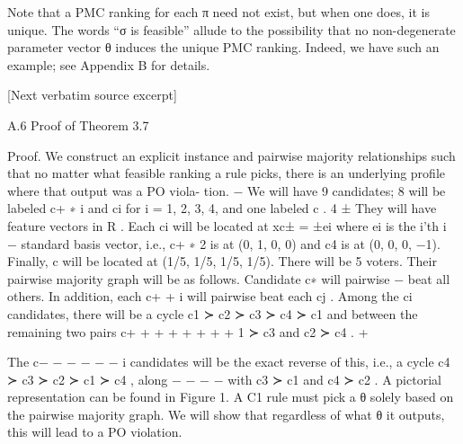 \documentclass[10pt]{article}
\begin{document}
\begin{ReviewVerbatim}
Note that a PMC ranking for each π need not exist, but when one does, it is unique. The words “σ
is feasible” allude to the possibility that no non-degenerate parameter vector θ induces the unique
PMC ranking. Indeed, we have such an example; see Appendix B for details.

[Next verbatim source excerpt]

A.6   Proof of Theorem 3.7

Proof. We construct an explicit instance and pairwise majority relationships such that no matter
what feasible ranking a rule picks, there is an underlying profile where that output was a PO viola-
tion.
                                                       −
We will have 9 candidates; 8 will be labeled c+                                              ∗
                                              i and ci for i = 1, 2, 3, 4, and one labeled c .
                                   4        ±
They will have feature vectors in R . Each ci will be located at xc± = ±ei where ei is the i’th
                                                                           i
                                                        −
standard basis vector, i.e., c+                                                          ∗
                              2 is at (0, 1, 0, 0) and c4 is at (0, 0, 0, −1). Finally, c will be located at
(1/5, 1/5, 1/5, 1/5).
There will be 5 voters. Their pairwise majority graph will be as follows. Candidate c∗ will pairwise
                                                                −
beat all others. In addition, each c+                                         +
                                    i will pairwise beat each cj . Among the ci candidates, there will
be a cycle c1 ≻ c2 ≻ c3 ≻ c4 ≻ c1 and between the remaining two pairs c+
             +      +     +      +    +                                              +       +
                                                                               1 ≻ c3 and c2 ≻ c4 .
                                                                                                   +

The c−                                                               −    −     −     −      −
      i candidates will be the exact reverse of this, i.e., a cycle c4 ≻ c3 ≻ c2 ≻ c1 ≻ c4 , along
       −     −        −     −
with c3 ≻ c1 and c4 ≻ c2 . A pictorial representation can be found in Figure 1.
A C1 rule must pick a θ solely based on the pairwise majority graph. We will show that regardless
of what θ it outputs, this will lead to a PO violation.



\end{ReviewVerbatim}
\end{document}
